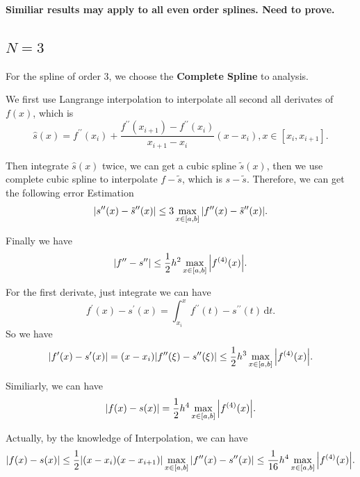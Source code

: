 \documentclass[a4paper]{article}
\begin{document}
\textbf{Similiar results may apply to all even order splines. Need to prove.}

\subsection{$N=3$}
For the spline of order $3$, we choose the \textbf{Complete Spline} to analysis. 

We first use Langrange interpolation to interpolate all second all derivates of $f(x)$, which is
\begin{equation}
    \hat{s}(x) = f^{\prime \prime}(x_i) + \frac{f^{\prime \prime} (x_{i+1}) - f^{\prime \prime}(x_i)}{x_{i+1}-x_i} (x-x_i), x \in [x_i, x_{i+1}].
\end{equation}

Then integrate $\hat{s}(x)$ twice, we can get a cubic spline $\tilde{s}(x)$, then we use complete cubic spline to interpolate 
$f - \tilde{s}$, which is $s - \tilde{s}$. Therefore, we can get the following error Estimation
\begin{equation}
    \abs{s^{\prime \prime}(x) - \tilde{s}^{\prime \prime}(x)} \leq 3 \max_{x \in [a,b]} \abs{f^{\prime \prime}(x) - \tilde{s}^{\prime \prime}(x)}.
\end{equation}

Finally we have 
\begin{equation}
    \abs{f^{\prime \prime} - s^{\prime \prime}} \leq \frac{1}{2} h^2 \max_{x \in [a,b]} \abs{f^{(4)}(x)}.
\end{equation}

For the first derivate, just integrate we can have
\begin{equation}
    f^{\prime}(x) - s^{\prime} (x) = \int_{x_i}^{x} f^{\prime \prime}(t) - s^{\prime \prime}(t) \, \mathrm{d}t.
\end{equation}
So we have 
\begin{equation}
    \abs{f^{\prime}(x) - s^{\prime} (x)} = (x - x_i) \abs{f^{\prime \prime}(\xi) - s^{\prime \prime}(\xi)} \leq \frac{1}{2} h^3 \max_{x \in [a,b]} \abs{f^{(4)}(x)}.
\end{equation}

Similiarly, we can have 
\begin{equation}
    \abs{f(x) - s(x)} = \frac{1}{2} h^4 \max_{x \in [a,b]} \abs{f^{(4)}(x)}.
\end{equation}

Actually, by the knowledge of Interpolation, we can have
\begin{equation}
    \abs{f(x) - s(x)} \leq \frac{1}{2} \abs{(x-x_i)(x-x_{i+1})} \max_{x \in [a,b]} \abs{f^{\prime \prime} (x) - s^{\prime \prime} (x)}
    \leq \frac{1}{16} h^4 \max_{x \in [a,b]} \abs{f^{(4)}(x)}.
\end{equation}
\end{document}
